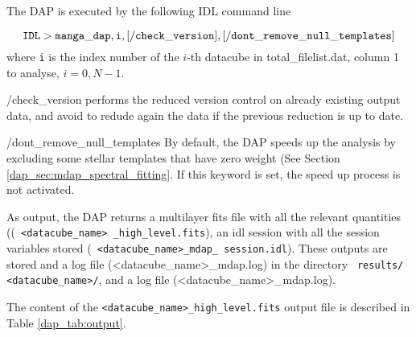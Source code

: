 \documentclass[11pt]{book}
\begin{document}
The DAP is executed by the following IDL command line 

\[
{\tt IDL> manga\_dap,i,[/check\_version],[/dont\_remove\_null\_templates]}
\]
where {\tt i} is the index number of the $i$-th datacube in total\_filelist.dat, column 1 to analyse, $i=0, N-1$.

/check\_version performs the reduced version control on already
existing output data, and avoid to redude again the data if the
previous reduction is up to date.

/dont\_remove\_null\_templates By default, the DAP speeds up the
analysis by excluding some stellar templates that have zero weight
(See Section \ref{dap_sec:mdap_spectral_fitting}. If this keyword is
set, the speed up process is not activated.



 As output, the DAP returns a
multilayer fits file with all the relevant quantities (({\tt
  <datacube\_name> \_high\_level.fits}), an idl session with all the
session variables stored ({\tt
  <datacube\_name>\_mdap\_ session.idl}). These outputs are stored and
a log file (<datacube\_name>\_mdap.log) in the directory {\tt
  results/ <datacube\_name>/}, and a log file
(<datacube\_name>\_mdap.log).

The content of the {\tt <datacube\_name>\_high\_level.fits} output
file is described in Table \ref{dap_tab:output}.
\end{document}
